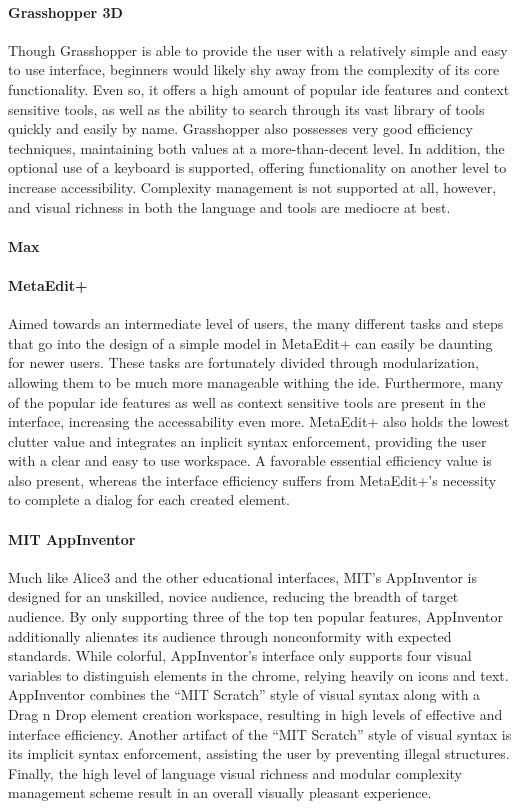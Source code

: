 \paragraph{Grasshopper 3D} Though Grasshopper is able to provide the user
with a relatively simple and easy to use interface, beginners would likely
shy away from the complexity of its core functionality. Even so, it offers
a high amount of popular \ac{ide} features and context sensitive tools, as
well as the ability to search through its vast library of tools quickly and
easily by name. Grasshopper also possesses very good efficiency techniques,
maintaining both values at a more-than-decent level. In addition, the
optional use of a keyboard is supported, offering functionality on another
level to increase accessibility. Complexity management is not supported at
all, however, and visual richness in both the language and tools are
mediocre at best.

\paragraph{Max}

\paragraph{MetaEdit+} Aimed towards an intermediate level of users, the
many different tasks and steps that go into the design of a simple model in
MetaEdit+ can easily be daunting for newer users.  These tasks are
fortunately divided through modularization, allowing them to be much more
manageable withing the \ac{ide}. Furthermore, many of the popular \ac{ide}
features as well as context sensitive tools are present in the interface,
increasing the accessability even more. MetaEdit+ also holds the lowest
clutter value and integrates an inplicit syntax enforcement, providing the
user with a clear and easy to use workspace. A favorable essential
efficiency value is also present, whereas the interface efficiency suffers
from MetaEdit+'s necessity to complete a dialog for each created element.

\paragraph{MIT AppInventor} Much like Alice3 and the other educational
interfaces, MIT's AppInventor is designed for an unskilled, novice
audience, reducing the breadth of target audience. By only supporting three
of the top ten popular features, AppInventor additionally alienates its
audience through nonconformity with expected standards. While colorful,
AppInventor's interface only supports four visual variables to distinguish
elements in the chrome, relying heavily on icons and text. AppInventor
combines the ``MIT Scratch'' style of visual syntax along with a Drag n
Drop element creation workspace, resulting in high levels of effective and
interface efficiency. Another artifact of the ``MIT Scratch'' style of
visual syntax is its implicit syntax enforcement, assisting the user by
preventing illegal structures. Finally, the high level of language visual
richness and modular complexity management scheme result in an overall
visually pleasant experience.

